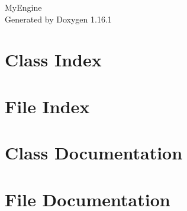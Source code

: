 \documentclass[twoside]{book}
\newcommand{\+}{\discretionary{\mbox{\scriptsize$\hookleftarrow$}}{}{}}
\newcommand{\clearemptydoublepage}{%
    \newpage{\pagestyle{empty}\cleardoublepage}%
  }
\begin{document}
  \raggedbottom
    \hypersetup{pageanchor=false,
                bookmarksnumbered=true,
                pdfencoding=unicode
               }
  \begin{titlepage}
  \vspace*{7cm}
  \begin{center}%
  {\Large My\+Engine}\\
  \vspace*{1cm}
  {\large Generated by Doxygen 1.16.1}\\
  \end{center}
  \end{titlepage}
  \clearemptydoublepage
  \tableofcontents
  \clearemptydoublepage
  \hypersetup{pageanchor=true}
\chapter{Class Index}

\chapter{File Index}

\chapter{Class Documentation}











\chapter{File Documentation}












  \backmatter
  \newpage
  \clearemptydoublepage
  \printindex
\end{document}

